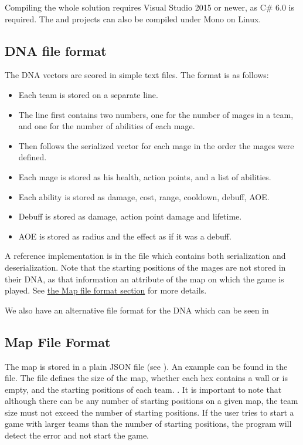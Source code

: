 Compiling the whole solution requires Visual Studio 2015 or newer, as C\# 6.0 is required. The  and  projects can also be compiled under Mono on Linux.

\subsection{DNA file format}
\label{dna-format}

The DNA vectors are scored in simple text files. The format is as follows:

\begin{itemize}
	\item Each team is stored on a separate line.
	\item The line first contains two numbers, one for the number of mages in a team, and one for the number of abilities of each mage.
	\item Then follows the serialized vector for each mage in the order the mages were defined.
	\item Each mage is stored as his health, action points, and a list of abilities.
	\item Each ability is stored as damage, cost, range, cooldown, debuff, AOE.
	\item Debuff is stored as damage, action point damage and lifetime.
	\item AOE is stored as radius and the effect as if it was a debuff.
\end{itemize}

A reference implementation is in the  file which contains both serialization and deserialization. Note that the starting positions of the mages are not stored in their DNA, as that information an attribute of the map on which the game is played. See \hyperref[map-format]{the Map file format section} for more details.

We also have an alternative file format for the DNA which can be seen in

\subsection{Map File Format}
\label{map-format}

The map is stored in a plain JSON file (see \citet{json}). An example can be found in the  file. The file defines the size of the map, whether each hex contains a wall or is empty, and the starting positions of each team. . It is important to note that although there can be any number of starting positions on a given map, the team size must not exceed the number of starting positions. If the user tries to start a game with larger teams than the number of starting positions, the program will detect the error and not start the game.

